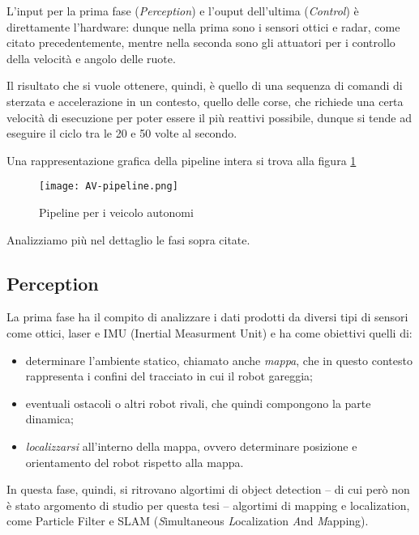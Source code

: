 L'input per la prima fase (\textit{Perception}) e l'ouput dell'ultima (\textit{Control})
è direttamente l'hardware: dunque nella prima sono i sensori ottici e radar, come citato precedentemente,
mentre nella seconda sono gli attuatori per i controllo della velocità e angolo delle ruote.

Il risultato che si vuole ottenere, quindi, è quello di una sequenza di comandi di sterzata e accelerazione
in un contesto, quello delle corse, che richiede una certa velocità di esecuzione per poter essere
il più reattivi possibile, dunque si tende ad eseguire il ciclo tra le 20 e 50 volte al secondo.

\noindent Una rappresentazione grafica della pipeline intera si trova alla figura \ref{fig:av-pipeline}\\
\begin{figure}[ht]
	\centering
	\caption{Pipeline per i veicolo autonomi}
	\texttt{[image: AV-pipeline.png]}
	\label{fig:av-pipeline}
\end{figure}

Analizziamo più nel dettaglio le fasi sopra citate.
\subsection{Perception}
La prima fase ha il compito di analizzare i dati prodotti da diversi tipi di sensori come
ottici, laser e IMU (Inertial Measurment Unit) e ha come obiettivi quelli di:
\begin{itemize}
	\item determinare l'ambiente statico, chiamato anche \textit{mappa}, che in questo contesto
	      rappresenta i confini del tracciato in cui il robot gareggia;
	\item eventuali ostacoli o altri robot rivali, che quindi compongono la
	      parte dinamica; \item \textit{localizzarsi} all'interno della mappa, ovvero
	      determinare posizione e orientamento del robot rispetto alla mappa.
\end{itemize}

In questa fase, quindi, si ritrovano algortimi di object detection -- di cui però non è stato argomento
di studio per questa tesi -- algortimi di mapping e localization, come Particle Filter e SLAM
(\textit{S}imultaneous \textit{L}ocalization \textit{A}nd \textit{M}apping).

